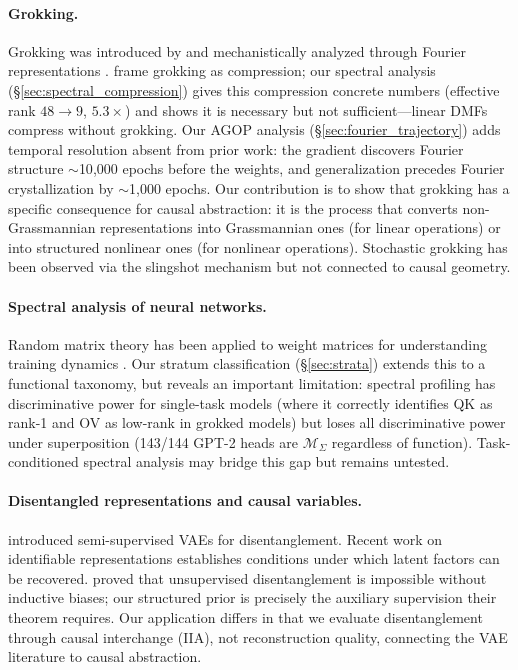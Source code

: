 \documentclass{article}
\begin{document}
\paragraph{Grokking.}
Grokking was introduced by \citet{power2022grokking} and mechanistically
analyzed through Fourier representations \citep{nanda2023progress,
zhong2024clock}. \citet{liu2023grokking} frame grokking as compression;
our spectral analysis (\S\ref{sec:spectral_compression}) gives this
compression concrete numbers (effective rank $48 \to 9$, $5.3\times$) and
shows it is necessary but not sufficient---linear DMFs compress without
grokking. Our AGOP analysis (\S\ref{sec:fourier_trajectory}) adds temporal
resolution absent from prior work: the gradient discovers Fourier structure
$\sim$10{,}000 epochs before the weights, and generalization precedes
Fourier crystallization by $\sim$1{,}000 epochs. Our contribution is to
show that grokking has a specific consequence for causal abstraction: it is
the process that converts non-Grassmannian representations into Grassmannian
ones (for linear operations) or into structured nonlinear ones (for nonlinear
operations). Stochastic grokking has been observed via the slingshot mechanism
\citep{thilak2022slingshot} but not connected to causal geometry.

\paragraph{Spectral analysis of neural networks.}
Random matrix theory has been applied to weight matrices for understanding
training dynamics \citep{martin2021implicit}. Our stratum classification
(\S\ref{sec:strata}) extends this to a functional taxonomy, but reveals an
important limitation: spectral profiling has discriminative power for
single-task models (where it correctly identifies QK as rank-1 and OV as
low-rank in grokked models) but loses all discriminative power under
superposition (143/144 GPT-2 heads are $\mathcal{M}_\Sigma$ regardless of
function). Task-conditioned spectral analysis may bridge this gap but remains
untested.

\paragraph{Disentangled representations and causal variables.}
\citet{narayanaswamy2017learning} introduced semi-supervised VAEs for
disentanglement. Recent work on identifiable representations
\citep{khemakhem2020variational} establishes conditions under which latent
factors can be recovered. \citet{locatello2019challenging} proved that
unsupervised disentanglement is impossible without inductive biases; our
structured prior is precisely the auxiliary supervision their theorem
requires. Our application differs in that we evaluate
disentanglement through causal interchange (IIA), not reconstruction quality,
connecting the VAE literature to causal abstraction.
\end{document}
